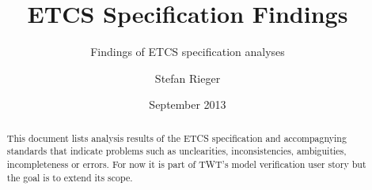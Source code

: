 \documentclass{template/openetcs_article}
\begin{document}
\frontmatter
{}







\title{ETCS Specification Findings}

\subtitle{Findings of ETCS specification analyses}

\date{September 2013}


\author{Stefan Rieger}







\begin{abstract}
  This document lists analysis results of the ETCS specification and accompagnying standards that indicate problems such as unclearities, inconsistencies, ambiguities, incompleteness or errors. For now it is part of TWT's model verification user story but the goal is to extend its scope.
\end{abstract}

\newcommand{\specissue}[1]{\subsubsection*{Issue \#\specissuecounter (#1)}\stepcounter{specissuecounter}}	


\maketitle
\end{document}
